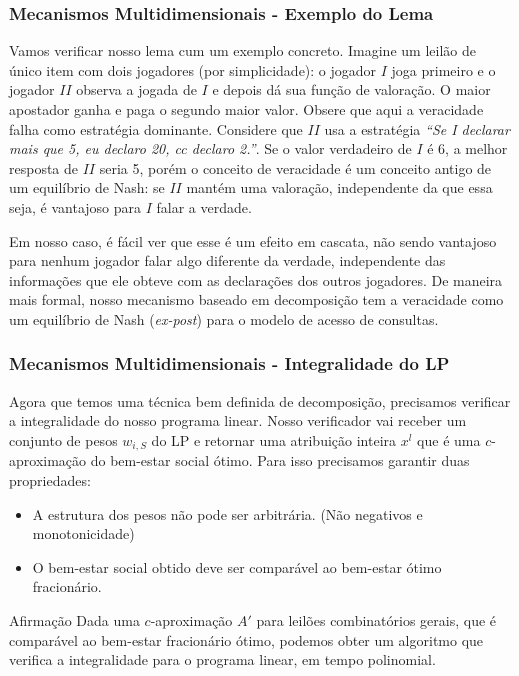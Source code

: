 \documentclass{beamer}
\begin{document}
\begin{frame}
    \frametitle{Mecanismos Multidimensionais - Exemplo do Lema}
    Vamos verificar nosso lema cum um exemplo concreto. Imagine um leilão de único item com dois jogadores (por simplicidade): o jogador $I$ joga primeiro e o jogador $II$ observa a jogada de $I$ e depois dá sua função de valoração. O maior apostador ganha e paga o segundo maior valor. Obsere que aqui a veracidade falha como estratégia dominante. Considere que $II$ usa a estratégia \textit{``Se I declarar mais que 5, eu declaro 20, cc declaro 2.''}. Se o valor verdadeiro de $I$ é 6, a melhor resposta de $II$ seria 5, porém o conceito de veracidade é um conceito antigo de um equilíbrio de Nash: se $II$ mantém uma valoração, independente da que essa seja, é vantajoso para $I$ falar a verdade.

    Em nosso caso, é fácil ver que esse é um efeito em cascata, não sendo vantajoso para nenhum jogador falar algo diferente da verdade, independente das informações que ele obteve com as declarações dos outros jogadores. De maneira mais formal, nosso mecanismo baseado em decomposição tem a veracidade como um equilíbrio de Nash (\textit{ex-post}) para o modelo de acesso de consultas.
\end{frame}

\begin{frame}
    \frametitle{Mecanismos Multidimensionais - Integralidade do LP}
    Agora que temos uma técnica bem definida de decomposição, precisamos verificar a integralidade do nosso programa linear. Nosso verificador vai receber um conjunto de pesos $w_{i, S}$ do LP e retornar uma atribuição inteira $x^l$ que é uma $c$-aproximação do bem-estar social ótimo. Para isso precisamos garantir duas propriedades:
    \begin{itemize}
        \item{A estrutura dos pesos não pode ser arbitrária. (Não negativos e monotonicidade)}
        \item{O bem-estar social obtido deve ser comparável ao bem-estar ótimo fracionário.}
    \end{itemize}

    \begin{block}{Afirmação}
        Dada uma $c$-aproximação $A'$ para leilões combinatórios gerais, que é comparável ao bem-estar fracionário ótimo, podemos obter um algoritmo que verifica a integralidade para o programa linear, em tempo polinomial.
    \end{block}
\end{frame}
\end{document}
